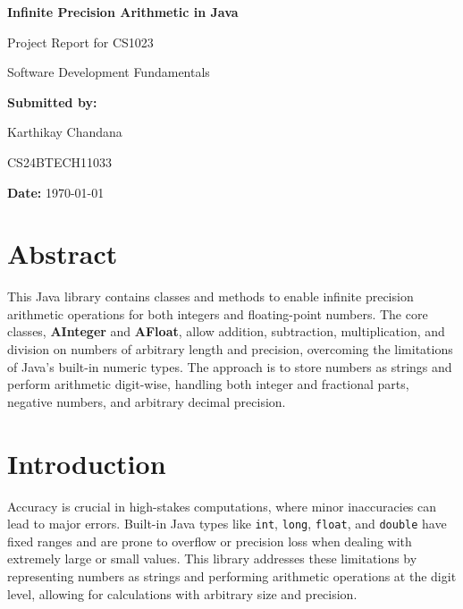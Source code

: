 \documentclass[12pt]{article}
\begin{document}
\begin{titlepage}
    \centering
    \vspace*{3cm}
    
    {\Huge \textbf{Infinite Precision Arithmetic in Java} \par}
    \vspace{1cm}
    
    {\Large Project Report for CS1023 \par}
    {\Large Software Development Fundamentals \par}
    
    \vspace{2.5cm}
    
    {\large \textbf{Submitted by:} \par}
    \vspace{0.3cm}
    {\large Karthikay Chandana \par}
    {\large CS24BTECH11033 \par}
    
    \vspace{2cm}
    
    {\large \textbf{Date:} \today \par}
    
    \vfill
\end{titlepage}

\section{Abstract}

This Java library contains classes and methods to enable infinite precision arithmetic operations for both integers and floating-point numbers. The core classes, \textbf{AInteger} and \textbf{AFloat}, allow addition, subtraction, multiplication, and division on numbers of arbitrary length and precision, overcoming the limitations of Java's built-in numeric types. The approach is to store numbers as strings and perform arithmetic digit-wise, handling both integer and fractional parts, negative numbers, and arbitrary decimal precision.

\section{Introduction}

Accuracy is crucial in high-stakes computations, where minor inaccuracies can lead to major errors. Built-in Java types like \texttt{int}, \texttt{long}, \texttt{float}, and \texttt{double} have fixed ranges and are prone to overflow or precision loss when dealing with extremely large or small values. This library addresses these limitations by representing numbers as strings and performing arithmetic operations at the digit level, allowing for calculations with arbitrary size and precision.
\end{document}
